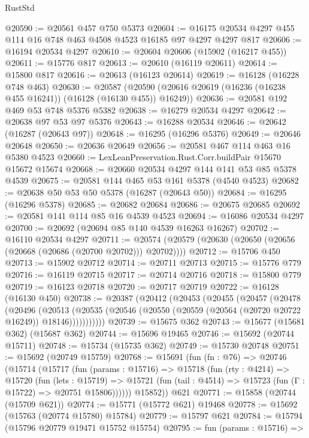 \begin{lexlean}{RustStd}
\begin{coremodule}
@20590 := @20561 @457 @750 @5373
@20604 := @16175 @20534 @4297 @455 @114 @16 @748 @463 @4508 @4523 @16185 @97 @4297 @4297 @817
@20606 := @16194 @20534 @4297
@20610 := @20604 @20606 (@15902 (@16217 @455))
@20611 := @15776 @817
@20613 := @20610 (@16119 @20611)
@20614 := @15800 @817
@20616 := @20613 (@16123 @20614)
@20619 := @16128 (@16228 @748 @463)
@20630 := @20587
    (@20590 (@20616 @20619 (@16236 (@16238 @455 @16241)) (@16128 (@16130 @455)) @16249))
@20636 := @20581 @192 @469 @53 @748 @5376 @5382
@20638 := @16279 @20534 @4297
@20642 := @20638 @97 @53 @97 @5376
@20643 := @16288 @20534
@20646 := @20642 (@16287 (@20643 @97))
@20648 := @16295 (@16296 @5376)
@20649 := @20646 @20648
@20650 := @20636 @20649
@20656 := @20581 @467 @114 @463 @16 @5380 @4523
@20660 := LexLeanPreservation.Rust.Corr.buildPair @15670 @15672 @15674
@20668 := @20660 @20534 @4297 @144 @141 @53 @85 @5378 @4539
@20675 := @20581 @144 @465 @53 @161 @5378 (@4540 @4523)
@20682 := @20638 @50 @53 @50 @5378 (@16287 (@20643 @50))
@20684 := @16295 (@16296 @5378)
@20685 := @20682 @20684
@20686 := @20675 @20685
@20692 := @20581 @141 @114 @85 @16 @4539 @4523
@20694 := @16086 @20534 @4297
@20700 := @20692 (@20694 @85 @140 @4539 @16263 @16267)
@20702 := @16110 @20534 @4297
@20711 := @20574 (@20579 (@20630 (@20650 (@20656 (@20668 (@20686 (@20700 @20702))) @20702))))
@20712 := @15706 @450
@20713 := @15902 @20712
@20714 := @20711 @20713
@20715 := @15776 @779
@20716 := @16119 @20715
@20717 := @20714 @20716
@20718 := @15800 @779
@20719 := @16123 @20718
@20720 := @20717 @20719
@20722 := @16128 (@16130 @450)
@20738 := @20387
    (@20412
      (@20453
        (@20455
          (@20457
            (@20478
              (@20496
                (@20513
                  (@20535 (@20546 (@20550 (@20559 (@20564 (@20720 @20722 @16249)) @18146)))))))))))
@20739 := @15675 @362
@20743 := @15677 (@15681 @362) (@15687 @362)
@20744 := @15696 @19465
@20746 := @15692 (@20744 @15711)
@20748 := @15734 (@15735 @362)
@20749 := @15730 @20748
@20751 := @15692 (@20749 @15759)
@20768 := @15691
    (fun (fn : @76) =>
    @20746
      (@15714
        (@15717
          (fun (params : @15716) =>
          @15718
            (fun (rty : @4214) =>
            @15720
              (fun (lets : @15719) =>
              @15721 (fun (tail : @4514) => @15723 (fun (Γ : @15722) => @20751 @15806))))))
        @15852))
    @621
@20771 := @15858 (@20744 (@15709 @621))
@20774 := @15771 (@15772 @621) @19468
@20778 := @15692 (@15763 (@20774 @15780) @15784)
@20779 := @15797 @621
@20784 := @15794 (@15796 @20779 @19471 @15752 @15754)
@20795 := fun (params : @15716) =>

\end{coremodule}
\end{lexlean}
